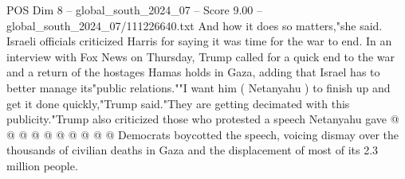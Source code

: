 \begin{textsample}{POS Dim 8 – global\_south\_2024\_07 – Score 9.00 – global\_south\_2024\_07/111226640.txt}
And how it does so matters,"she said.
Israeli officials criticized Harris for saying it was time for the war to end.
In an interview with Fox News on Thursday, Trump called for a quick end to the war and a return of the hostages Hamas holds in Gaza, adding that Israel has to better manage its"public relations.""I want him ( Netanyahu ) to finish up and get it done quickly,"Trump said."They are getting decimated with this publicity."Trump also criticized those who protested a speech Netanyahu gave @ @ @ @ @ @ @ @ @ @ Democrats boycotted the speech, voicing dismay over the thousands of civilian deaths in Gaza and the displacement of most of its 2.3 million people.

\end{textsample}
